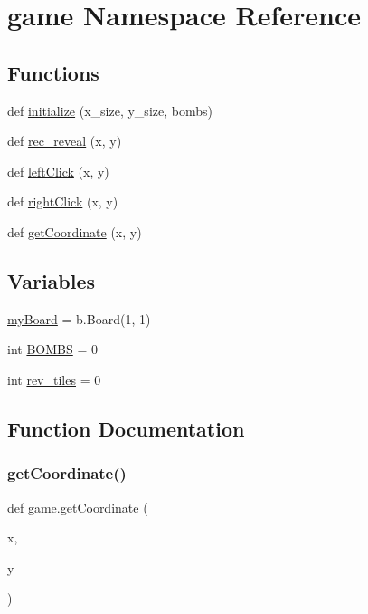 \hypertarget{namespacegame}{}\section{game Namespace Reference}
\label{namespacegame}
\subsection*{Functions}
\begin{DoxyCompactItemize}
\item 
def \mbox{\hyperlink{namespacegame_aeff970ada18ae074610055efd1094336}{initialize}} (x\+\_\+size, y\+\_\+size, bombs)
\item 
def \mbox{\hyperlink{namespacegame_a2037de1992c21b7b89134d2523e2613a}{rec\+\_\+reveal}} (x, y)
\item 
def \mbox{\hyperlink{namespacegame_abe058d32c820bac4e3cef6d7fe4a46a9}{left\+Click}} (x, y)
\item 
def \mbox{\hyperlink{namespacegame_a004c6f8ef3349c23a158399780ec85be}{right\+Click}} (x, y)
\item 
def \mbox{\hyperlink{namespacegame_a06fbfc9a0a7901893478f3c433ce40ec}{get\+Coordinate}} (x, y)
\end{DoxyCompactItemize}
\subsection*{Variables}
\begin{DoxyCompactItemize}
\item 
\mbox{\hyperlink{namespacegame_a3c18f6e9c14fb8b2ee7b7d3a571d9871}{my\+Board}} = b.\+Board(1, 1)
\item 
int \mbox{\hyperlink{namespacegame_a3eb01cc0a7bb0f38c53f6d096a912956}{B\+O\+M\+BS}} = 0
\item 
int \mbox{\hyperlink{namespacegame_a6cd9259a874ea0314ecba5873425a8b0}{rev\+\_\+tiles}} = 0
\end{DoxyCompactItemize}


\subsection{Function Documentation}
\mbox{\label{namespacegame_a06fbfc9a0a7901893478f3c433ce40ec}} 
\subsubsection{\texorpdfstring{getCoordinate()}{getCoordinate()}}
{\footnotesize\ttfamily def game.\+get\+Coordinate (\begin{DoxyParamCaption}\item[{}]{x,  }\item[{}]{y }\end{DoxyParamCaption})}

